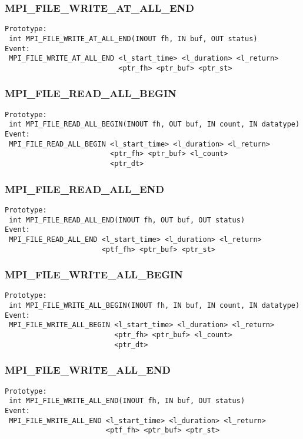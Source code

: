 \documentclass[9pt]{article}
\begin{document}
\subsubsection{MPI\_FILE\_WRITE\_AT\_ALL\_END}
\label{sec:MPIFILEWRITEATALLEND}
\begin{verbatim}
Prototype:
 int MPI_FILE_WRITE_AT_ALL_END(INOUT fh, IN buf, OUT status)
Event:
 MPI_FILE_WRITE_AT_ALL_END <l_start_time> <l_duration> <l_return>
                           <ptr_fh> <ptr_buf> <ptr_st>
\end{verbatim}

\subsubsection{MPI\_FILE\_READ\_ALL\_BEGIN}
\label{sec:MPIFILEREADALLBEGIN}
\begin{verbatim}
Prototype:
 int MPI_FILE_READ_ALL_BEGIN(INOUT fh, OUT buf, IN count, IN datatype)
Event:
 MPI_FILE_READ_ALL_BEGIN <l_start_time> <l_duration> <l_return>
                         <ptr_fh> <ptr_buf> <l_count>
                         <ptr_dt>
\end{verbatim}

\subsubsection{MPI\_FILE\_READ\_ALL\_END}
\label{sec:MPIFILEREADALLEND}
\begin{verbatim}
Prototype:
 int MPI_FILE_READ_ALL_END(INOUT fh, OUT buf, OUT status)
Event:
 MPI_FILE_READ_ALL_END <l_start_time> <l_duration> <l_return>
                       <ptf_fh> <ptr_buf> <ptr_st>
\end{verbatim}

\subsubsection{MPI\_FILE\_WRITE\_ALL\_BEGIN}
\label{sec:MPIFILEWRITEALLBEGIN}
\begin{verbatim}
Prototype:
 int MPI_FILE_WRITE_ALL_BEGIN(INOUT fh, IN buf, IN count, IN datatype)
Event:
 MPI_FILE_WRITE_ALL_BEGIN <l_start_time> <l_duration> <l_return>
                          <ptr_fh> <ptr_buf> <l_count>
                          <ptr_dt>
\end{verbatim}

\subsubsection{MPI\_FILE\_WRITE\_ALL\_END}
\label{sec:MPIFILEWRITEALLEND}
\begin{verbatim}
Prototype:
 int MPI_FILE_WRITE_ALL_END(INOUT fh, IN buf, OUT status)
Event:
 MPI_FILE_WRITE_ALL_END <l_start_time> <l_duration> <l_return>
                        <ptf_fh> <ptr_buf> <ptr_st>
\end{verbatim}
\end{document}
